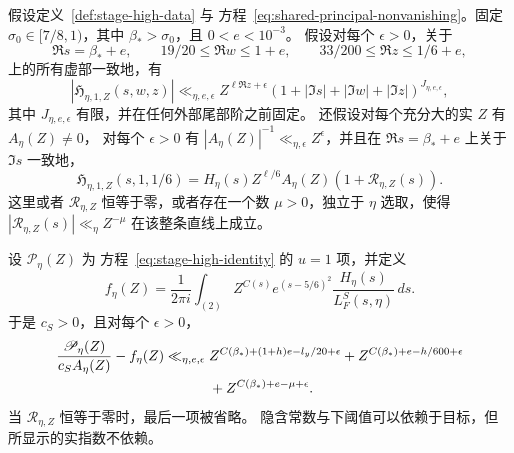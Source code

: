 \begin{lemma}[主信号的提取]
\label{lem:principal-residue-interface}
假设定义~\ref{def:stage-high-data} 与
方程~\eqref{eq:shared-principal-nonvanishing}。固定
$\sigma_0\in[7/8,1)$，其中 $\beta_*>\sigma_0$，且 $0<e<10^{-3}$。
假设对每个 $\epsilon>0$，关于
\[
 \Re s=\beta_*+e,\qquad 19/20\le\Re w\le1+e,
 \qquad 33/200\le\Re z\le1/6+e,
\]
上的所有虚部一致地，有
\begin{equation}
 |\mathfrak H_{\eta,1,Z}(s,w,z)|
 \ll_{\eta,e,\epsilon} Z^{\ell\Re z+\epsilon}
  (1+|\Im s|+|\Im w|+|\Im z|)^{J_{\eta,e,\epsilon}},
 \label{eq:principal-correction-bound}
\end{equation}
其中 $J_{\eta,e,\epsilon}$ 有限，并在任何外部尾部阶之前固定。
还假设对每个充分大的实 $Z$ 有 $A_\eta(Z)\ne0$，
对每个 $\epsilon>0$ 有
$|A_\eta(Z)|^{-1}\ll_{\eta,\epsilon}Z^\epsilon$，并且在
$\Re s=\beta_*+e$ 上关于 $\Im s$ 一致地，
\begin{equation}
 \mathfrak H_{\eta,1,Z}(s,1,1/6)
 =H_\eta(s)Z^{\ell/6}A_\eta(Z)(1+\mathcal R_{\eta,Z}(s)).
 \label{eq:principal-correction-residue}
\end{equation}
这里或者 $\mathcal R_{\eta,Z}$ 恒等于零，或者存在一个数
$\mu>0$，独立于 $\eta$ 选取，使得
$|\mathcal R_{\eta,Z}(s)|\ll_\eta Z^{-\mu}$ 在该整条直线上成立。

设 $\mathscr P_\eta(Z)$ 为
方程~\eqref{eq:stage-high-identity} 的 $u=1$ 项，并定义
\[
 f_\eta(Z)=\frac1{2\pi i}\int_{(2)}
    Z^{C(s)}e^{(s-5/6)^2}\frac{H_\eta(s)}{L_F^S(s,\eta)}\,ds.
\]
于是 $c_S>0$，且对每个 $\epsilon>0$，
\begin{align}
 \frac{\mathscr P_\eta(Z)}{c_SA_\eta(Z)}-f_\eta(Z)
 \ll_{\eta,e,\epsilon}{}&
 Z^{C(\beta_*)+(1+h)e-l_y/20+\epsilon}
 +Z^{C(\beta_*)+e-h/600+\epsilon}\notag\\
 &+Z^{C(\beta_*)+e-\mu+\epsilon}.
 \label{eq:principal-remainder-bound}
\end{align}
当 $\mathcal R_{\eta,Z}$ 恒等于零时，最后一项被省略。
隐含常数与下阈值可以依赖于目标，但所显示的实指数不依赖。
\end{lemma}

